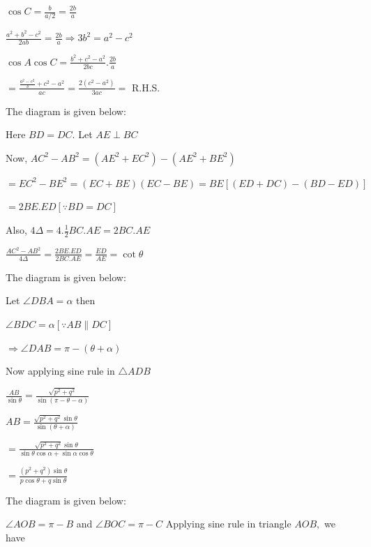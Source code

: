   \startplacefigure
    \externalfigure[18_4.pdf]
  \stopplacefigure

  $\cos C = \frac{b}{a/2} = \frac{2b}{a}$

  $\frac{a^2 + b^2 - c^2}{2ab} = \frac{2b}{a} \Rightarrow 3b^2 = a^2 - c^2$

  $\cos A\cos C = \frac{b^2 + c^2 - a^2}{2bc}.\frac{2b}{a}$

  $= \frac{\frac{a^2 - c^2}{3} + c^2 - a^2}{ac} = \frac{2(c^2 - a^2)}{3ac} =$ R.H.S.

\item The diagram is given below:

  \startplacefigure
    \externalfigure[18_5.pdf]
  \stopplacefigure

  Here $BD = DC.$ Let $AE\perp BC$

  Now, $AC^2 - AB^2 = (AE^2 + EC^2) - (AE^2 + BE^2)$

  $= EC^2 - BE^2 = (EC + BE)(EC - BE) = BE[(ED + DC) - (BD - ED)]$

  $= 2BE.ED[\because BD=DC]$

  Also, $4\Delta = 4.\frac{1}{2}BC.AE = 2BC.AE$

  $\frac{AC^2 - AB^2}{4\Delta} = \frac{2BE.ED}{2BC.AE} = \frac{ED}{AE} = \cot\theta$

\item The diagram is given below:

  \startplacefigure
    \externalfigure[18_6.pdf]
  \stopplacefigure

  Let $\angle DBA = \alpha$ then

  $\angle BDC = \alpha [\because AB\parallel DC]$

  $\Rightarrow \angle DAB = \pi - (\theta + \alpha)$

  Now applying sine rule in $\triangle ADB$

  $\frac{AB}{\sin \theta} = \frac{\sqrt{p^2 + q^2}}{\sin(\pi  - \theta - \alpha)}$

  $AB = \frac{\sqrt{p^2 + q^2}\sin\theta}{\sin(\theta + \alpha)}$

  $= \frac{\sqrt{p^2 + q^2}\sin\theta}{\sin\theta\cos\alpha + \sin\alpha\cos\theta}$


  $= \frac{(p^2 + q^2)\sin\theta}{p\cos\theta + q\sin\theta}$

\item The diagram is given below:

  \startplacefigure
    \externalfigure[18_7.pdf]
  \stopplacefigure

  $\angle AOB = \pi - B$ and $\angle BOC = \pi - C$
  Applying sine rule in triangle $AOB,$ we have

